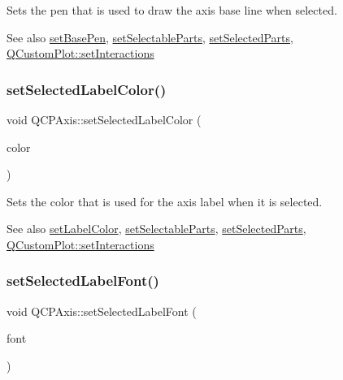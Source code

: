 Sets the pen that is used to draw the axis base line when selected.

\begin{DoxySeeAlso}{See also}
\hyperlink{class_q_c_p_axis_a778d45fb71b3c7ab3bb7079e18b058e4}{set\+Base\+Pen}, \hyperlink{class_q_c_p_axis_a513f9b9e326c505d9bec54880031b085}{set\+Selectable\+Parts}, \hyperlink{class_q_c_p_axis_ab9d7a69277dcbed9119b3c1f25ca19c3}{set\+Selected\+Parts}, \hyperlink{class_q_custom_plot_a5ee1e2f6ae27419deca53e75907c27e5}{Q\+Custom\+Plot\+::set\+Interactions} 
\end{DoxySeeAlso}
\mbox{\label{class_q_c_p_axis_a5d502dec597c634f491fdd73d151c72d}} 
\subsubsection{\texorpdfstring{set\+Selected\+Label\+Color()}{setSelectedLabelColor()}}
{\footnotesize\ttfamily void Q\+C\+P\+Axis\+::set\+Selected\+Label\+Color (\begin{DoxyParamCaption}\item[{const Q\+Color \&}]{color }\end{DoxyParamCaption})}

Sets the color that is used for the axis label when it is selected.

\begin{DoxySeeAlso}{See also}
\hyperlink{class_q_c_p_axis_a6c906fe56d75f0122335b9f79b999608}{set\+Label\+Color}, \hyperlink{class_q_c_p_axis_a513f9b9e326c505d9bec54880031b085}{set\+Selectable\+Parts}, \hyperlink{class_q_c_p_axis_ab9d7a69277dcbed9119b3c1f25ca19c3}{set\+Selected\+Parts}, \hyperlink{class_q_custom_plot_a5ee1e2f6ae27419deca53e75907c27e5}{Q\+Custom\+Plot\+::set\+Interactions} 
\end{DoxySeeAlso}
\mbox{\label{class_q_c_p_axis_a02ec2a75d4d8401eaab834fbc6803d30}} 
\subsubsection{\texorpdfstring{set\+Selected\+Label\+Font()}{setSelectedLabelFont()}}
{\footnotesize\ttfamily void Q\+C\+P\+Axis\+::set\+Selected\+Label\+Font (\begin{DoxyParamCaption}\item[{const Q\+Font \&}]{font }\end{DoxyParamCaption})}

